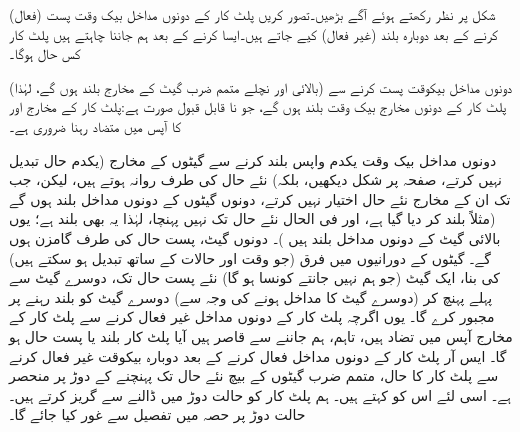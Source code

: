 شکل  پر نظر رکھتے ہوئے  آگے بڑھیں۔تصور کریں  پلٹ کار کے دونوں مداخل بیک وقت     پست (فعال)   کرنے کے بعد دوبارہ  بلند (غیر فعال) کیے جاتے ہیں۔ایسا کرنے کے بعد ہم جاننا چاہتے ہیں  پلٹ کار کس حال  ہوگا۔

دونوں مداخل بیکوقت  پست کرنے سے (بالائی اور نچلے متمم ضرب گیٹ کے  مخارج بلند ہوں گے، لہٰذا)  پلٹ کار کے دونوں مخارج بیک وقت بلند ہوں گے، جو نا قابل قبول  صورت ہے:پلٹ کار  کے مخارج   اور   کا آپس میں  متضاد  رہنا  ضروری ہے۔

  دونوں مداخل  بیک وقت یکدم  واپس  بلند کرنے سے گیٹوں کے مخارج  (یکدم حال تبدیل نہیں کرتے،  صفحہ  پر شکل  دیکھیں، بلکہ)   نئے حال  کی طرف  روانہ ہوتے ہیں، لیکن، جب تک  ان کے مخارج نئے حال اختیار نہیں کرتے، دونوں گیٹوں کے دونوں مداخل بلند ہوں گے (مثلاً    بلند کر دیا گیا ہے، اور فی الحال  نئے حال تک نہیں پہنچا، لہٰذا یہ بھی  بلند ہے؛ یوں بالائی گیٹ کے دونوں مداخل بلند ہیں )۔  دونوں گیٹ، پست حال  کی طرف گامزن ہوں گے۔ گیٹوں کے دورانیوں میں فرق (جو وقت اور حالات کے ساتھ تبدیل ہو سکتے ہیں)  کی بنا، ایک گیٹ (جو  ہم نہیں  جانتے کونسا ہو گا)   نئے پست حال تک، دوسرے گیٹ سے پہلے  پہنچ کر (دوسرے گیٹ کا مداخل ہونے کی وجہ سے)  دوسرے گیٹ کو بلند رہنے پر مجبور کرے گا۔   یوں اگرچہ پلٹ کار کے  دونوں مداخل غیر فعال کرنے سے پلٹ کار کے مخارج آپس میں تضاد ہیں، تاہم، ہم   جاننے سے قاصر ہیں  آیا  پلٹ کار بلند یا پست حال  ہو گا۔ ایس آر پلٹ کار کے دونوں مداخل فعال کرنے کے بعد دوبارہ بیکوقت  غیر فعال کرنے سے  پلٹ کار کا حال،  متمم ضرب گیٹوں کے بیچ نئے حال تک پہنچنے کے  دوڑ پر منحصر ہے۔ اسی لئے اس کو     کہتے ہیں۔ ہم پلٹ کار کو حالت دوڑ میں ڈالنے سے گریز کرتے ہیں۔ حالت دوڑ پر  حصہ  میں تفصیل سے غور کیا جائے گا۔
  

